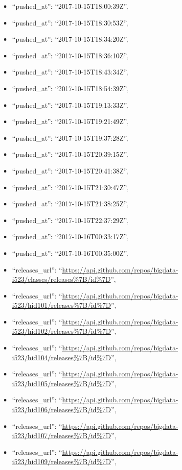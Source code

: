 \begin{itemize}
\item
  ``pushed\_at'': ``2017-10-15T18:00:39Z'',
\item
  ``pushed\_at'': ``2017-10-15T18:30:53Z'',
\item
  ``pushed\_at'': ``2017-10-15T18:34:20Z'',
\item
  ``pushed\_at'': ``2017-10-15T18:36:10Z'',
\item
  ``pushed\_at'': ``2017-10-15T18:43:34Z'',
\item
  ``pushed\_at'': ``2017-10-15T18:54:39Z'',
\item
  ``pushed\_at'': ``2017-10-15T19:13:33Z'',
\item
  ``pushed\_at'': ``2017-10-15T19:21:49Z'',
\item
  ``pushed\_at'': ``2017-10-15T19:37:28Z'',
\item
  ``pushed\_at'': ``2017-10-15T20:39:15Z'',
\item
  ``pushed\_at'': ``2017-10-15T20:41:38Z'',
\item
  ``pushed\_at'': ``2017-10-15T21:30:47Z'',
\item
  ``pushed\_at'': ``2017-10-15T21:38:25Z'',
\item
  ``pushed\_at'': ``2017-10-15T22:37:29Z'',
\item
  ``pushed\_at'': ``2017-10-16T00:33:17Z'',
\item
  ``pushed\_at'': ``2017-10-16T00:35:00Z'',
\item
  ``releases\_url'':
  ``\url{https://api.github.com/repos/bigdata-i523/classes/releases\%7B/id\%7D}'',
\item
  ``releases\_url'':
  ``\url{https://api.github.com/repos/bigdata-i523/hid101/releases\%7B/id\%7D}'',
\item
  ``releases\_url'':
  ``\url{https://api.github.com/repos/bigdata-i523/hid102/releases\%7B/id\%7D}'',
\item
  ``releases\_url'':
  ``\url{https://api.github.com/repos/bigdata-i523/hid104/releases\%7B/id\%7D}'',
\item
  ``releases\_url'':
  ``\url{https://api.github.com/repos/bigdata-i523/hid105/releases\%7B/id\%7D}'',
\item
  ``releases\_url'':
  ``\url{https://api.github.com/repos/bigdata-i523/hid106/releases\%7B/id\%7D}'',
\item
  ``releases\_url'':
  ``\url{https://api.github.com/repos/bigdata-i523/hid107/releases\%7B/id\%7D}'',
\item
  ``releases\_url'':
  ``\url{https://api.github.com/repos/bigdata-i523/hid109/releases\%7B/id\%7D}'',

\end{itemize}
